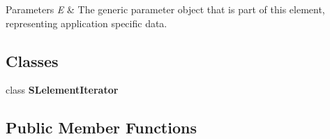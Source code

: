 \begin{DoxyParams}{Parameters}
{\em E} & The generic parameter object that is part of this element, representing application specific data. \\
\hline
\end{DoxyParams}
\subsection*{Classes}
\begin{DoxyCompactItemize}
\item 
class {\bfseries S\+Lelement\+Iterator}
\end{DoxyCompactItemize}
\subsection*{Public Member Functions}
